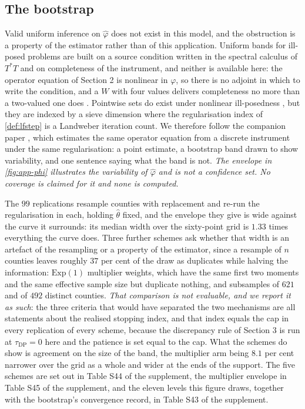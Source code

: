 \documentclass[
  12pt]{article}
\newcommand{\1}[1]{\mathds{1}\left[#1\right]}
\theoremstyle{plain}
\theoremstyle{definition}
\theoremstyle{definition}
\theoremstyle{remark}
\begin{document}
\subsection{The bootstrap}\label{the-bootstrap}

Valid uniform inference on \(\hat\varphi\) does not exist in this model,
and the obstruction is a property of the estimator rather than of this
application. Uniform bands for ill-posed problems are built on a source
condition written in the spectral calculus of \(T^\ast T\) and on
completeness of the instrument, and neither is available here: the
operator equation of Section 2 is nonlinear in \(\varphi\), so there is
no adjoint in which to write the condition, and a \(W\) with four values
delivers completeness no more than a two-valued one does
\citep[see][]{severini2006,babiiflorens2025}. Pointwise sets do exist
under nonlinear ill-posedness \citep[see][]{chen2012b}, but they are
indexed by a sieve dimension where the regularisation index of
\cref{def:lfstep} is a Landweber iteration count. We therefore follow
the companion paper \citep{centorrinofeveflorens2019}, which estimates
the same operator equation from a discrete instrument under the same
regularisation: a point estimate, a bootstrap band drawn to show
variability, and one sentence saying what the band is not. \emph{The
envelope in \cref{fig:app-phi} illustrates the variability of
\(\hat\varphi\) and is not a confidence set. No coverage is claimed for
it and none is computed.}

The \(99\) replications resample counties with replacement and re-run
the regularisation in each, holding \(\hat\theta\) fixed, and the
envelope they give is wide against the curve it surrounds: its median
width over the sixty-point grid is \(1.33\) times everything the curve
does. Three further schemes ask whether that width is an artefact of the
resampling or a property of the estimator, since a resample of \(n\)
counties leaves roughly \(37\) per cent of the draw as duplicates while
halving the information: \(\mathrm{Exp}(1)\) multiplier weights, which
have the same first two moments and the same effective sample size but
duplicate nothing, and subsamples of \(621\) and of \(492\) distinct
counties. \emph{That comparison is not evaluable, and we report it as
such}: the three criteria that would have separated the two mechanisms
are all statements about the realised stopping index, and that index
equals the cap in every replication of every scheme, because the
discrepancy rule of Section 3 is run at \(\tau_{\mathrm{DP}}=0\) here
and the patience is set equal to the cap. What the schemes do show is
agreement on the size of the band, the multiplier arm being \(8.1\) per
cent narrower over the grid as a whole and wider at the ends of the
support. The five schemes are set out in Table S44 of the supplement,
the multiplier envelope in Table S45 of the supplement, and the eleven
levels this figure draws, together with the bootstrap's convergence
record, in Table S43 of the supplement.
\end{document}
